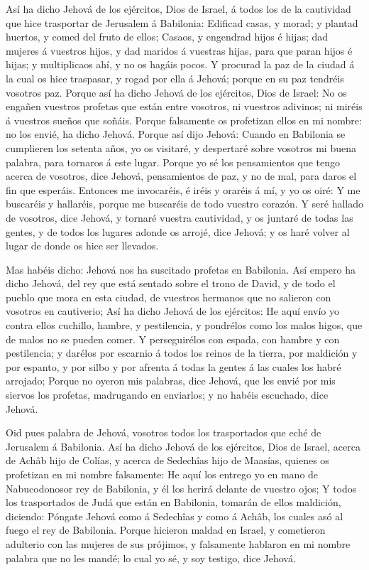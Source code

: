  Así ha dicho Jehová de los ejércitos, Dios de Israel, á
todos los de la cautividad que hice trasportar de Jerusalem á Babilonia:
 Edificad casas, y morad; y plantad huertos, y comed del
fruto de ellos;  Casaos, y engendrad hijos é hijas; dad
mujeres á vuestros hijos, y dad maridos á vuestras hijas, para que paran
hijos é hijas; y multiplicaos ahí, y no os hagáis pocos.  Y
procurad la paz de la ciudad á la cual os hice traspasar, y rogad por
ella á Jehová; porque en su paz tendréis vosotros paz. 
Porque así ha dicho Jehová de los ejércitos, Dios de Israel: No os
engañen vuestros profetas que están entre vosotros, ni vuestros
adivinos; ni miréis á vuestros sueños que soñáis.  Porque
falsamente os profetizan ellos en mi nombre: no los envié, ha dicho
Jehová.  Porque así dijo Jehová: Cuando en Babilonia se
cumplieren los setenta años, yo os visitaré, y despertaré sobre vosotros
mi buena palabra, para tornaros á este lugar.  Porque yo sé
los pensamientos que tengo acerca de vosotros, dice Jehová, pensamientos
de paz, y no de mal, para daros el fin que esperáis. 
Entonces me invocaréis, é iréis y oraréis á mí, y yo os oiré:
 Y me buscaréis y hallaréis, porque me buscaréis de todo
vuestro corazón.  Y seré hallado de vosotros, dice Jehová,
y tornaré vuestra cautividad, y os juntaré de todas las gentes, y de
todos los lugares adonde os arrojé, dice Jehová; y os haré volver al
lugar de donde os hice ser llevados.

 Mas habéis dicho: Jehová nos ha suscitado profetas en
Babilonia.  Así empero ha dicho Jehová, del rey que está
sentado sobre el trono de David, y de todo el pueblo que mora en esta
ciudad, de vuestros hermanos que no salieron con vosotros en cautiverio;
 Así ha dicho Jehová de los ejércitos: He aquí envío yo
contra ellos cuchillo, hambre, y pestilencia, y pondrélos como los malos
higos, que de malos no se pueden comer.  Y perseguirélos
con espada, con hambre y con pestilencia; y darélos por escarnio á todos
los reinos de la tierra, por maldición y por espanto, y por silbo y por
afrenta á todas la gentes á las cuales los habré arrojado; 
Porque no oyeron mis palabras, dice Jehová, que les envié por mis
siervos los profetas, madrugando en enviarlos; y no habéis escuchado,
dice Jehová.

 Oid pues palabra de Jehová, vosotros todos los
trasportados que eché de Jerusalem á Babilonia.  Así ha
dicho Jehová de los ejércitos, Dios de Israel, acerca de Achâb hijo de
Colías, y acerca de Sedechîas hijo de Maasías, quienes os profetizan en
mi nombre falsamente: He aquí los entrego yo en mano de Nabucodonosor
rey de Babilonia, y él los herirá delante de vuestro ojos; 
Y todos los trasportados de Judá que están en Babilonia, tomarán de
ellos maldición, diciendo: Póngate Jehová como á Sedechîas y como á
Achâb, los cuales asó al fuego el rey de Babilonia.  Porque
hicieron maldad en Israel, y cometieron adulterio con las mujeres de sus
prójimos, y falsamente hablaron en mi nombre palabra que no les mandé;
lo cual yo sé, y soy testigo, dice Jehová.

